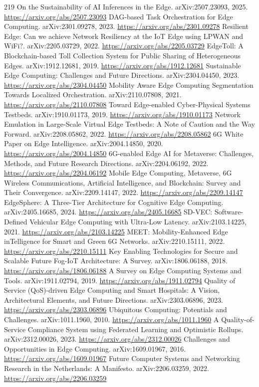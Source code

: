 \documentclass[11pt]{article}
\begin{document}
\begin{thebibliography}{219}
 On the Sustainability of AI Inferences in the Edge. arXiv:2507.23093, 2025. \url{https://arxiv.org/abs/2507.23093}
 DAG-based Task Orchestration for Edge Computing. arXiv:2301.09278, 2023. \url{https://arxiv.org/abs/2301.09278}
 Resilient Edge: Can we achieve Network Resiliency at the IoT Edge using LPWAN and WiFi?. arXiv:2205.03729, 2022. \url{https://arxiv.org/abs/2205.03729}
 EdgeToll: A Blockchain-based Toll Collection System for Public Sharing of Heterogeneous Edges. arXiv:1912.12681, 2019. \url{https://arxiv.org/abs/1912.12681}
 Sustainable Edge Computing: Challenges and Future Directions. arXiv:2304.04450, 2023. \url{https://arxiv.org/abs/2304.04450}
 Mobility Aware Edge Computing Segmentation Towards Localized Orchestration. arXiv:2110.07808, 2021. \url{https://arxiv.org/abs/2110.07808}
 Toward Edge-enabled Cyber-Physical Systems Testbeds. arXiv:1910.01173, 2019. \url{https://arxiv.org/abs/1910.01173}
 Network Emulation in Large-Scale Virtual Edge Testbeds: A Note of Caution and the Way Forward. arXiv:2208.05862, 2022. \url{https://arxiv.org/abs/2208.05862}
 6G White Paper on Edge Intelligence. arXiv:2004.14850, 2020. \url{https://arxiv.org/abs/2004.14850}
 6G-enabled Edge AI for Metaverse: Challenges, Methods, and Future Research Directions. arXiv:2204.06192, 2022. \url{https://arxiv.org/abs/2204.06192}
 Mobile Edge Computing, Metaverse, 6G Wireless Communications, Artificial Intelligence, and Blockchain: Survey and Their Convergence. arXiv:2209.14147, 2022. \url{https://arxiv.org/abs/2209.14147}
 EdgeSphere: A Three-Tier Architecture for Cognitive Edge Computing. arXiv:2405.16685, 2024. \url{https://arxiv.org/abs/2405.16685}
 SD-VEC: Software-Defined Vehicular Edge Computing with Ultra-Low Latency. arXiv:2103.14225, 2021. \url{https://arxiv.org/abs/2103.14225}
 MEET: Mobility-Enhanced Edge inTelligence for Smart and Green 6G Networks. arXiv:2210.15111, 2022. \url{https://arxiv.org/abs/2210.15111}
 Key Enabling Technologies for Secure and Scalable Future Fog-IoT Architecture: A Survey. arXiv:1806.06188, 2018. \url{https://arxiv.org/abs/1806.06188}
 A Survey on Edge Computing Systems and Tools. arXiv:1911.02794, 2019. \url{https://arxiv.org/abs/1911.02794}
 Quality of Service (QoS)-driven Edge Computing and Smart Hospitals: A Vision, Architectural Elements, and Future Directions. arXiv:2303.06896, 2023. \url{https://arxiv.org/abs/2303.06896}
 Ubiquitous Computing: Potentials and Challenges. arXiv:1011.1960, 2010. \url{https://arxiv.org/abs/1011.1960}
 A Quality-of-Service Compliance System using Federated Learning and Optimistic Rollups. arXiv:2312.00026, 2023. \url{https://arxiv.org/abs/2312.00026}
 Challenges and Opportunities in Edge Computing. arXiv:1609.01967, 2016. \url{https://arxiv.org/abs/1609.01967}
 Future Computer Systems and Networking Research in the Netherlands: A Manifesto. arXiv:2206.03259, 2022. \url{https://arxiv.org/abs/2206.03259}
\end{thebibliography}
\end{document}
